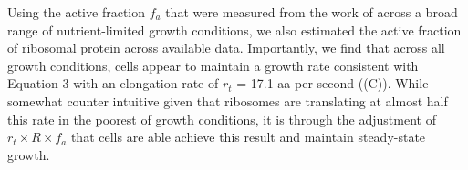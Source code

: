 Using the active fraction $f_a$ that were measured from the work of
\cite{dai2016} across a broad range of nutrient-limited growth conditions, we
also estimated the active fraction of ribosomal protein across available data.
Importantly, we find that across all growth conditions, cells appear to maintain
a growth rate consistent with Equation 3 with an elongation rate of $r_t$ = 17.1
aa per second ((C)). While somewhat counter
intuitive given that ribosomes are translating at almost half this rate in the
poorest of growth conditions, it is through the adjustment of $r_t \times R
\times f_a$ that cells are able achieve this result and maintain steady-state
growth.



%
